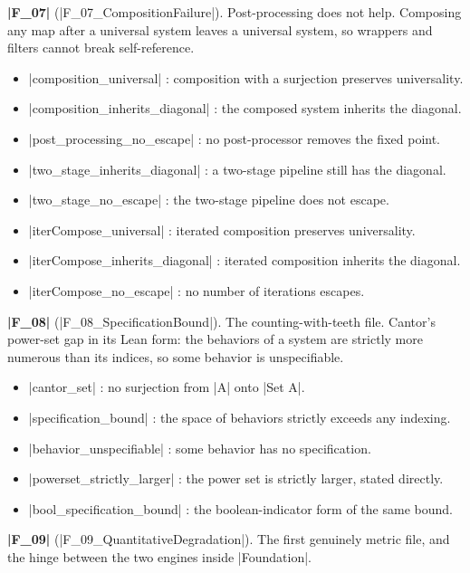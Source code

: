 \documentclass{memoir}
\begin{document}
\textbf{\LeanVerb|F_07|} (\LeanVerb|F_07_CompositionFailure|). Post-processing does not help. Composing any
map after a universal system leaves a universal system, so wrappers and filters
cannot break self-reference.

\begin{itemize}
\item \LeanVerb|composition_universal| : composition with a surjection preserves universality.
\item \LeanVerb|composition_inherits_diagonal| : the composed system inherits the diagonal.
\item \LeanVerb|post_processing_no_escape| : no post-processor removes the fixed point.
\item \LeanVerb|two_stage_inherits_diagonal| : a two-stage pipeline still has the diagonal.
\item \LeanVerb|two_stage_no_escape| : the two-stage pipeline does not escape.
\item \LeanVerb|iterCompose_universal| : iterated composition preserves universality.
\item \LeanVerb|iterCompose_inherits_diagonal| : iterated composition inherits the diagonal.
\item \LeanVerb|iterCompose_no_escape| : no number of iterations escapes.

\end{itemize}


\textbf{\LeanVerb|F_08|} (\LeanVerb|F_08_SpecificationBound|). The counting-with-teeth file. Cantor's
power-set gap in its Lean form: the behaviors of a system are strictly more numerous
than its indices, so some behavior is unspecifiable.

\begin{itemize}
\item \LeanVerb|cantor_set| : no surjection from \LeanVerb|A| onto \LeanVerb|Set A|.
\item \LeanVerb|specification_bound| : the space of behaviors strictly exceeds any indexing.
\item \LeanVerb|behavior_unspecifiable| : some behavior has no specification.
\item \LeanVerb|powerset_strictly_larger| : the power set is strictly larger, stated directly.
\item \LeanVerb|bool_specification_bound| : the boolean-indicator form of the same bound.

\end{itemize}


\textbf{\LeanVerb|F_09|} (\LeanVerb|F_09_QuantitativeDegradation|). The first genuinely metric file, and the
hinge between the two engines inside \LeanVerb|Foundation|.
\end{document}
